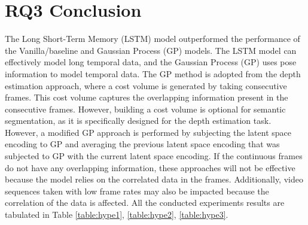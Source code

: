 	
	\newpage
	
	\section{RQ3 Conclusion}   
	
	The Long Short-Term Memory (LSTM) model outperformed the performance of the Vanilla/baseline and Gaussian Process (GP) models. The LSTM model can effectively model long temporal data, and the Gaussian Process (GP) uses pose information to model temporal data. The GP method is adopted from the depth estimation approach, where a cost volume is generated by taking consecutive frames. This cost volume captures the overlapping information present in the consecutive frames. However, building a cost volume is optional for semantic segmentation, as it is specifically designed for the depth estimation task.
	However, a modified GP approach is performed by subjecting the latent space encoding to GP and averaging the previous latent space encoding that was subjected to GP with the current latent space encoding. If the continuous frames do not have any overlapping information, these approaches will not be effective because the model relies on the correlated data in the frames. Additionally, video sequences taken with low frame rates may also be impacted because the correlation of the data is affected. All the conducted experiments results are tabulated in Table \ref{table:hype1}, \ref{table:hype2}, \ref{table:hype3}.
	
	
	


